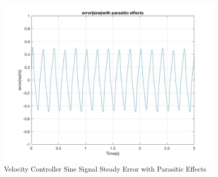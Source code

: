 \documentclass[letterpaper]{article}
\begin{document}
\begin{figure}[H]
\begin{center}
\includegraphics[width = 12cm]{Error(sine)with_parasitic_effects.jpg}
\caption{Velocity Controller Sine Signal Steady Error with Parasitic Effects}
\label{velocity_control_sine_error_noise}
\end{center}
\end{figure}
\end{document}
